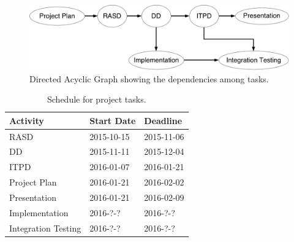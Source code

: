\begin{figure}
    \centering
    \includegraphics[width=\textwidth]{figures/TasksDAG.pdf}
    \caption{Directed Acyclic Graph showing the dependencies among tasks.}
    \label{fig:tasks-dag}
\end{figure}

\begin{table}[p]
    \centering
    \begin{tabular}{| l | l | l |}
        \hline
        \textbf{Activity}   & \textbf{Start Date}   & \textbf{Deadline} \\
        \hline
        RASD                & 2015-10-15            & 2015-11-06        \\
        DD                  & 2015-11-11            & 2015-12-04        \\
        ITPD                & 2016-01-07            & 2016-01-21        \\
        Project Plan        & 2016-01-21            & 2016-02-02        \\
        Presentation        & 2016-01-21            & 2016-02-09        \\
        Implementation      & 2016-?-?              & 2016-?-?          \\
        Integration Testing & 2016-?-?              & 2016-?-?          \\
        \hline
    \end{tabular}
    \caption{Schedule for project tasks.}
    \label{tab:schedule}
\end{table}

